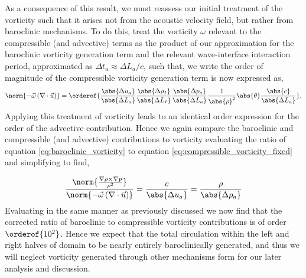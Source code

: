 As a consequence of this result, we must reassess our initial
treatment of the vorticity such that it arises not from the acoustic
velocity field, but rather from baroclinic mechanisms. To do this,
treat the vorticity $\omega$ relevant to the compressible (and
advective) terms as the product of our approximation for the
baroclinic vorticity generation term and the relevant wave-interface
interaction period, approximated as $\Delta t_a\approx\Delta L_a/c$,
such that, we write the order of magnitude of the compressible
vorticity generation term is now expressed as, 
%
\begin{align}
  \label{eq:compressible_vorticity_fixed}%
  \norm{-\vec{\omega}\left(\nabla\cdot\vec{u}\right)} = \orderof{\frac{\abs{\Delta u_a}}{\abs{\Delta L_a}} \frac{\abs{\Delta \rho_I}}{\abs{\Delta L_I}}\frac{\abs{\Delta p_a}}{\abs{\Delta L_a}}\frac{1}{\abs{\rho}^2}\abs{\theta}\frac{\abs{c}}{\abs{\Delta L_a}}}.%
\end{align}
%
Applying this treatment of vorticity leads to an identical order
expression for the order of the advective contribution. Hence we again
compare the baroclinic and compressible (and advective) contributions
to vorticity evaluating the ratio of equation \eqref{eq:baroclinic_vorticity} to equation
\eqref{eq:compressible_vorticity_fixed} and simplifying to find,

\begin{align} \label{eq:vorticity_comparison_fixed}
\frac{\norm{\frac{\nabla\rho\times\nabla p}{\rho^2}}}{\norm{-\vec{\omega}\left(\nabla\cdot\vec{u}\right)}} = \frac{c}{\abs{\Delta u_a}} = \frac{\rho}{\abs{\Delta \rho_a}}%
\end{align}
Evaluating in the same manner as previously discussed we now find that
the corrected ratio of baroclinic to compressible vorticity
contributions is of order $\orderof{10^2}$. Hence we expect that the
total circulation within the left and right halves of domain to be
nearly entirely baroclinically generated, and thus we will neglect
vorticity generated through other mechanisms form for our later
analysis and discussion.

